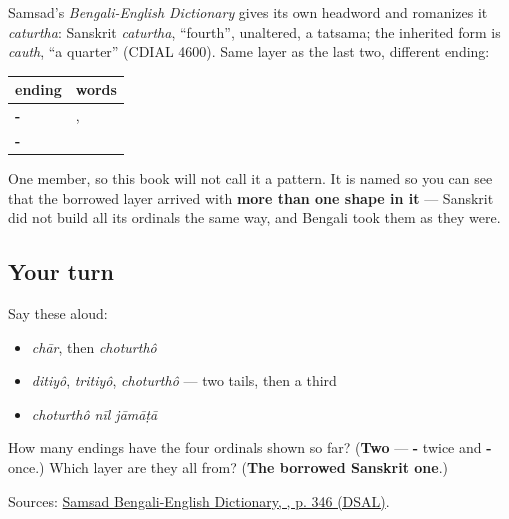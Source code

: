 \begin{grammarlens}[title={What you've built: three endings, and only one of them repeats}]
Samsad's \emph{Bengali-English Dictionary} gives \textbf{} its own headword and romanizes it \emph{caturtha}: Sanskrit \emph{caturtha}, \textquotedblleft{}fourth\textquotedblright{}, unaltered, a tatsama; the inherited form is \emph{cauth}, \textquotedblleft{}a quarter\textquotedblright{} (CDIAL 4600). Same layer as the last two, different ending:

\noindent
\begin{tabularx}{\linewidth}{@{}>{\raggedright\arraybackslash}X>{\raggedright\arraybackslash}X@{}}
\toprule
\textbf{ending} & \textbf{words} \\
\midrule
\textbf{-\bn{তীয়}} & \textbf{\bn{দ্বিতীয়}}, \textbf{\bn{তৃতীয়}} \\
\textbf{-\bn{র্থ}} & \textbf{\bn{চতুর্থ}} \\
\bottomrule
\end{tabularx}

One member, so this book will not call it a pattern. It is named so you can see that the borrowed layer arrived with \textbf{more than one shape in it} — Sanskrit did not build all its ordinals the same way, and Bengali took them as they were.
\end{grammarlens}

\subsection*{Your turn}
Say these aloud:

\begin{itemize}
\raggedright
  \item \emph{chār}, then \emph{choturthô}
  \item \emph{ditiyô}, \emph{tritiyô}, \emph{choturthô} — two tails, then a third
  \item \emph{choturthô nīl jāmāṭā}
\end{itemize}

\begin{tcolorbox}[breakable,colback=teal!4,colframe=teal!35!black,title={Before you move on}]
How many endings have the four ordinals shown so far? (\textbf{Two} — \textbf{-} twice and \textbf{-} once.) Which layer are they all from? (\textbf{The borrowed Sanskrit one}.)

Sources: \href{https://dsal.uchicago.edu/cgi-bin/app/biswas-bengali\_query.py?qs=\%E0\%A6\%9A\%E0\%A6\%A4\%E0\%A7\%81\%E0\%A6\%B0\%E0\%A7\%8D\%E0\%A6\%A5\&searchhws=yes}{Samsad Bengali-English Dictionary, , p. 346 (DSAL)}.
\end{tcolorbox}

